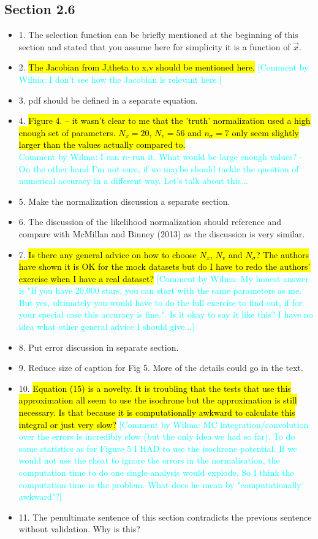 \documentclass[10pt,a4paper]{article}
\newcommand{\HW}[1]{\textcolor{Cyan}{#1}}
\begin{document}
\subsection{Section 2.6}
\begin{itemize}
\item 1. The selection function can be briefly mentioned at the beginning of this section and stated that you assume here for simplicity it is a function of $\vec{x}$.
\item 2. \hl{The Jacobian from J,theta to x,v should be mentioned here.} \HW{[Comment by Wilma: I don't see how the Jacobian is relevant here.]}
\item 3. pdf should be defined in a separate equation.
\item 4. \hl{Figure 4. -- it wasn't clear to me that the 'truth' normalization used a high enough set of parameters. $N_x=20$, $N_v=56$ and $n_\sigma=7$ only seem slightly larger than the values actually compared to.}\\\HW{Comment by Wilma: I can re-run it. What would be large enough values? - On the other hand I'm not sure, if we maybe should tackle the question of numerical accuracy in a different way. Let's talk about this...}
\item 5. Make the normalization discussion a separate section.
\item 6. The discussion of the likelihood normalization should reference and compare with McMillan and Binney (2013) as the discussion is very similar.
\item 7. \hl{Is there any general advice on how to choose $N_x$, $N_v$ and $N_\sigma$? The authors have shown it is OK for the mock datasets but do I have to redo the authors' exercise when I have a real dataset?} \HW{[Comment by Wilma: My honest answer is "If you have 20,000 stars, you can start with the same parameters as me. But yes, ultimately you would have to do the full exercise to find out, if for your special case this accuracy is fine.". Is it okay to say it like this? I have no idea what other general advice I should give...]}
\item 8. Put error discussion in separate section.
\item 9. Reduce size of caption for Fig 5. More of the details could go in the text.
\item 10. \hl{Equation (15) is a novelty. It is troubling that the tests that use this approximation all seem to use the isochrone but the approximation is still necessary. Is that because it is computationally awkward to calculate this integral or just very slow?} \HW{[Comment by Wilma: MC integration/convolution over the errors is incredibly slow (but the only idea we had so far). To do some statistics as for Figure 5 I HAD to use the isochrone potential. If we would not use the cheat to ignore the errors in the normalisation, the computation time to do one single analysis would explode. So I think the computation time is the problem. What does he mean by "computationally awkward"?]}
\item 11. The penultimate sentence of this section contradicts the previous sentence without validation. Why is this?
\end{itemize}
\end{document}
